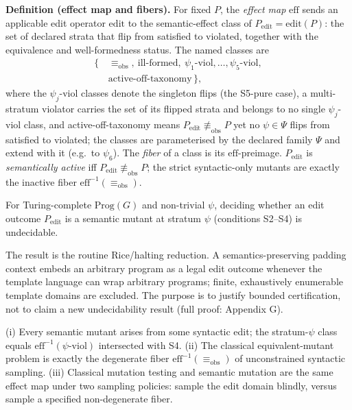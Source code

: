 \documentclass[manuscript,screen,review]{acmart}
\begin{document}
\textbf{Definition (effect map and fibers).} For fixed $P$, the
\emph{effect map} $\mathrm{eff}$ sends an applicable edit operator
$\mathrm{edit}$ to the
semantic-effect class of $P_{\mathrm{edit}} = \mathrm{edit}(P)$: the set
of declared strata that flip from satisfied to violated, together with
the equivalence and well-formedness status. The named classes are
\[
\begin{aligned}
\{\,&\equiv_{\mathrm{obs}},\ \text{ill-formed},\
      \psi_1\text{-viol}, \dots, \psi_5\text{-viol},\\
   &\text{active-off-taxonomy}\,\},
\end{aligned}
\]
where the $\psi_j$-viol classes denote the singleton flips (the
S5-pure case), a multi-stratum violator carries the set of its flipped
strata and belongs to no single $\psi_j$-viol class, and
active-off-taxonomy means $P_{\mathrm{edit}} \not\equiv_{\mathrm{obs}} P$ yet no
$\psi \in \Psi$ flips from satisfied to violated; the classes are
parameterised by the declared family $\Psi$ and extend with it
(e.g.\ to $\psi_6$). The \emph{fiber} of a
class is its $\mathrm{eff}$-preimage. $P_{\mathrm{edit}}$ is \emph{semantically active} iff
$P_{\mathrm{edit}} \not\equiv_{\mathrm{obs}} P$; the strict syntactic-only mutants are exactly
the inactive fiber $\mathrm{eff}^{-1}(\equiv_{\mathrm{obs}})$.

\begin{theorem}\label{thm:undecidability}
For
Turing-complete $\mathrm{Prog}(G)$ and non-trivial $\psi$, deciding
whether an edit outcome $P_{\mathrm{edit}}$ is a semantic mutant at stratum $\psi$
(conditions S2--S4) is undecidable.
\end{theorem}

The result is the routine Rice/halting reduction. A
semantics-preserving padding context embeds an arbitrary program as a
legal edit outcome whenever the template language can wrap arbitrary
programs; finite, exhaustively enumerable template domains are excluded.
The purpose is to justify bounded certification, not to claim a new
undecidability result (full proof: Appendix G).

\begin{proposition}\label{prop:fiber}
(i) Every semantic mutant arises from some syntactic edit; the
stratum-$\psi$ class equals $\mathrm{eff}^{-1}(\psi\text{-viol})$ intersected
with S4. (ii) The classical equivalent-mutant problem is exactly the
degenerate fiber $\mathrm{eff}^{-1}(\equiv_{\mathrm{obs}})$ of unconstrained syntactic
sampling. (iii) Classical mutation testing and semantic mutation are the
same effect map under two sampling policies: sample the edit domain
blindly, versus sample a specified non-degenerate fiber.
\end{proposition}
\end{document}
